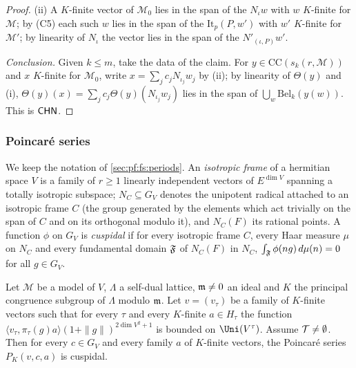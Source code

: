 \begin{proof}
(ii) A $K$-finite vector of $\mathcal M_0$ lies in the span of the $N_\iota w$ with $w$ $K$-finite for $\mathcal M$; by (C5) each such $w$ lies in
the span of the $\mathrm{It}_p(P,w')$ with $w'$ $K$-finite for $\mathcal M'$; by linearity of $N_\iota$ the vector lies in the span of the
$N'_{(\iota,P)}w'$.

\emph{Conclusion.} Given $k\le m$, take the data of the claim. For $y\in\mathrm{CC}(s_k(r,\mathcal M))$ and $x$ $K$-finite for $\mathcal M_0$, write
$x=\sum_jc_jN_{\iota_j}w_j$ by (ii); by linearity of $\Theta(y)$ and (i), $\Theta(y)(x)=\sum_jc_j\Theta(y)(N_{\iota_j}w_j)$ lies in the span of
$\bigcup_w\mathrm{Bel}_k(y(w))$. This is $\mathsf{CHN}$.
\end{proof}

\subsubsection{Poincar\'e series}

We keep the notation of \cref{sec:pf:fs:periods}. An \emph{isotropic frame} of a hermitian space $V$ is a family of $r\ge1$ linearly
independent vectors of $E^{\dim V}$ spanning a totally isotropic subspace; $N_C\subseteq G_V$ denotes the unipotent radical attached to an
isotropic frame $C$ (the group generated by the elements which act trivially on the span of $C$ and on its orthogonal modulo it), and
$N_C(F)$ its rational points. A function $\phi$ on $G_V$ is \emph{cuspidal} if for every isotropic frame $C$, every Haar measure $\mu$ on $N_C$
and every fundamental domain $\mathfrak F$ of $N_C(F)$ in $N_C$, $\int_{\mathfrak F}\phi(ng)\,d\mu(n)=0$ for all $g\in G_V$.

\begin{lemma}\label{pf:fs:poinCusp}
Let $\mathcal M$ be a model of $V$, $\Lambda$ a self-dual lattice, $\mathfrak m\ne0$ an ideal and $K$ the principal congruence subgroup of $\Lambda$
modulo $\mathfrak m$. Let $v=(v_\tau)$ be a family of $K$-finite vectors such that for every $\tau$ and every $K$-finite $a\in H_\tau$ the function
$\langle v_\tau,\pi_\tau(g)a\rangle(1+\|g\|)^{2\dim V^2+1}$ is bounded on $\Uni(V^\tau)$. Assume $\mathcal T\ne\emptyset$. Then for every $c\in G_V$ and
every family $a$ of $K$-finite vectors, the Poincar\'e series $P_K(v,c,a)$ is cuspidal.
\end{lemma}

